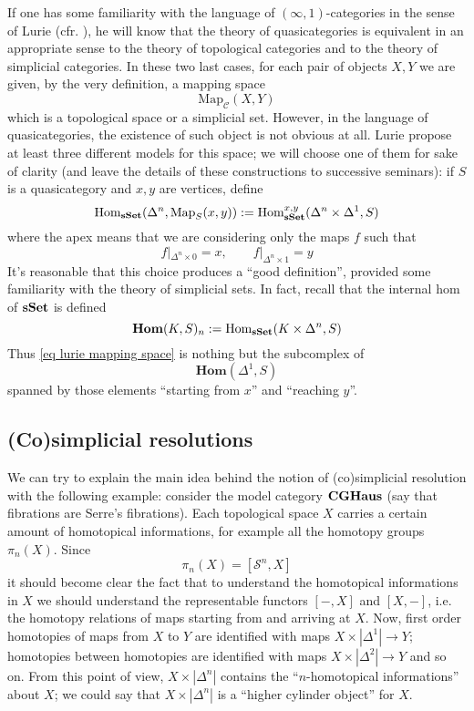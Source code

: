 If one has some familiarity with the language of $(\infty,1)$-categories in the sense of Lurie (cfr. \cite{htt}), he will know that the theory of quasicategories is equivalent in an appropriate sense to the theory of topological categories and to the theory of simplicial categories. In these two last cases, for each pair of objects $X,Y$ we are given, by the very definition, a mapping space
\[
\mathrm{Map}_{\mathcal C}(X,Y)
\]
which is a topological space or a simplicial set. However, in the language of quasicategories, the existence of such object is not obvious at all. Lurie propose at least three different models for this space; we will choose one of them for sake of clarity (and leave the details of these constructions to successive seminars): if $S$ is a quasicategory and $x,y$ are vertices, define
\begin{equation} \label{eq lurie mapping space}
\mathrm{Hom}_{\mathbf{sSet}}(\Delta^n, \mathrm{Map}_S(x,y)) := \mathrm{Hom}_{\mathbf{sSet}}^{x,y}(\Delta^n \times \Delta^1, S)
\end{equation}
where the apex means that we are considering only the maps $f$ such that
\[
f |_{\Delta^n \times 0} = x, \qquad f |_{\Delta^n \times 1} = y
\]
It's reasonable that this choice produces a ``good definition'', provided some familiarity with the theory of simplicial sets. In fact, recall that the internal hom of $\mathbf{sSet}$ is defined
\[
\mathbf{Hom}(K,S)_n := \mathrm{Hom}_{\mathbf{sSet}}(K \times \Delta^n, S)
\]
Thus \eqref{eq lurie mapping space} is nothing but the subcomplex of
\[
\mathbf{Hom}(\Delta^1,S)
\]
spanned by those elements ``starting from $x$'' and ``reaching $y$''.

\subsection{(Co)simplicial resolutions} \label{cosimplicial resolutions}

We can try to explain the main idea behind the notion of (co)simplicial resolution with the following example: consider the model category $\mathbf{CGHaus}$ (say that fibrations are Serre's fibrations). Each topological space $X$ carries a certain amount of homotopical informations, for example all the homotopy groups $\pi_n(X)$. Since
\[
\pi_n(X) = [\mathcal S^n, X]
\]
it should become clear the fact that to understand the homotopical informations in $X$ we should understand the representable functors $[-,X]$ and $[X,-]$, i.e. the homotopy relations of maps starting from and arriving at $X$. Now, first order homotopies of maps from $X$ to $Y$ are identified with maps $X \times |\Delta^1| \to Y$; homotopies between homotopies are identified with maps $X \times |\Delta^2| \to Y$ and so on. From this point of view, $X \times |\Delta^n|$ contains the ``$n$-homotopical informations'' about $X$; we could say that $X \times |\Delta^n|$ is a ``higher cylinder object'' for $X$.

